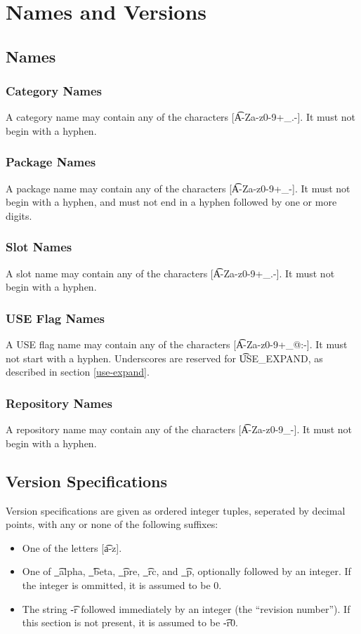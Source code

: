 \chapter{Names and Versions}

\section{Names}
\subsection{Category Names}
A category name may contain any of the characters [\t{A-Za-z0-9+\_.-}]. It must not begin with
a hyphen.

\subsection{Package Names}
A package name may contain any of the characters [\t{A-Za-z0-9+\_-}]. It must not begin with a
hyphen, and must not end in a hyphen followed by one or more digits.

\subsection{Slot Names}
\label{slot-names}
A slot name may contain any of the characters [\t{A-Za-z0-9+\_.-}]. It must not begin with a
hyphen.

\subsection{USE Flag Names}
A USE flag name may contain any of the characters [\t{A-Za-z0-9+\_@:-}]. It must not start with
a hyphen. Underscores are reserved for \t{USE\_EXPAND}, as described in section
\ref{use-expand}.

\subsection{Repository Names}
\label{repository-names}
A repository name may contain any of the characters [\t{A-Za-z0-9\_-}]. It must not begin with a
hyphen.

\section{Version Specifications}
Version specifications are given as ordered integer tuples, seperated by decimal points, with any or
none of the following suffixes:
\begin{itemize}
\item One of the letters [\t{a-z}].
\item One of \t{\_alpha}, \t{\_beta}, \t{\_pre}, \t{\_rc}, and \t{\_p}, optionally followed by an
    integer. If the integer is ommitted, it is assumed to be 0.
\item The string \t{-r} followed immediately by an integer (the ``revision number''). If this section
    is not present, it is assumed to be \t{-r0}.
\end{itemize}

